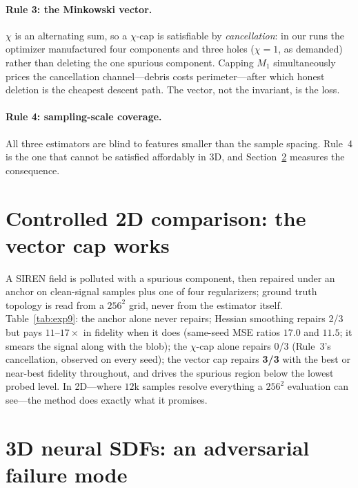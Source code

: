 \documentclass[10pt]{article}
\begin{document}
\paragraph{Rule 3: the Minkowski vector.} $\chi$ is an alternating sum, so a
$\chi$-cap is satisfiable by \emph{cancellation}: in our runs the optimizer
manufactured four components and three holes ($\chi=1$, as demanded) rather than
deleting the one spurious component. Capping $M_1$ simultaneously prices the
cancellation channel---debris costs perimeter---after which honest deletion is the
cheapest descent path. The vector, not the invariant, is the loss.

\paragraph{Rule 4: sampling-scale coverage.} All three estimators are blind to
features smaller than the sample spacing. Rule~4 is the one that cannot be satisfied
affordably in 3D, and Section~\ref{sec:sdf} measures the consequence.

\section{Controlled 2D comparison: the vector cap works}
\label{sec:invitro}

A SIREN field is polluted with a spurious component, then repaired under an anchor on
clean-signal samples plus one of four regularizers; ground truth topology is read from
a $256^2$ grid, never from the estimator itself. Table~\ref{tab:exp9}: the anchor
alone never repairs; Hessian smoothing repairs 2/3 but pays $11$--$17\times$ in
fidelity when it does (same-seed MSE ratios $17.0$ and $11.5$; it smears the signal
along with the blob); the $\chi$-cap alone
repairs 0/3 (Rule~3's cancellation, observed on every seed); the vector cap repairs
\textbf{3/3} with the best or near-best fidelity throughout, and drives the spurious
region below the lowest probed level. In 2D---where $12$k samples resolve everything a
$256^2$ evaluation can see---the method does exactly what it promises.

\begin{table}[t]
\centering
\caption{\textbf{2D topology repair} (3 seeds; grid-verified). ``Repaired'' means
(1~component, 0~holes) at every probed level.}
\label{tab:exp9}

\end{table}

\section{3D neural SDFs: an adversarial failure mode}
\label{sec:sdf}
\end{document}
